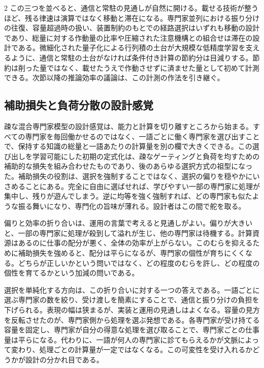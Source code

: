 \documentclass[lualatex,a4paper,10pt]{jlreq}
\begin{document}
\begin{multicols}{2}
この三つを並べると、通信と常駐の見通しが自然に開ける。載せる技術が整うほど、残る律速は演算ではなく移動と滞在になる。専門家並列における振り分けの往復、容量超過時の扱い、装置制約のもとでの経路選択はいずれも移動の設計であり\autocite{gshard}\autocite{deepseekmoe}、総量に対する作動量の比率や圧縮された注意機構との組合せは滞在の設計である\autocite{deepseekv2}。微細化された量子化による行列積の土台が大規模な低精度学習を支えるように\autocite{deepseekv3}\autocite{deepgemm}、通信と常駐の土台がなければ条件付き計算の節約分は目減りする。節約は削った量ではなく、載せたうえで作動させずに済ませた量として初めて計測できる。次節以降の推論効率の議論は、この計測の作法を引き継ぐ。

\subsection{補助損失と負荷分散の設計感覚}
疎な混合専門家模型の設計感覚は、能力と計算を切り離すところから始まる。すべての専門家を毎回働かせるのではなく、一語ごとに働く専門家を選び出すことで、保持する知識の総量と一語あたりの計算量を別の欄で大きくできる。この選び出しを学習可能にした初期の定式化は、疎なゲーティングと負荷を均すための補助的な損失を組み合わせたものであり、後のあらゆる選択方式の祖型になった\autocite{shazeer2017}。補助損失の役割は、選択を強制することではなく、選択の偏りを穏やかにいさめることにある。完全に自由に選ばせれば、学びやすい一部の専門家に処理が集中し、残りが遊んでしまう。逆に均等を強く強制すれば、どの専門家も似たような振る舞いになり、専門化の旨味が薄れる。設計者はこの間で舵を取る。

偏りと効率の折り合いは、運用の言葉で考えると見通しがよい。偏りが大きいと、一部の専門家に処理が殺到して溢れが生じ、他の専門家は待機する。計算資源はあるのに仕事の配分が悪く、全体の効率が上がらない。このむらを抑えるために補助損失を強めると、配分は平らになるが、専門家の個性が育ちにくくなる。どちらが正しいかという問いではなく、どの程度のむらを許し、どの程度の個性を育てるかという加減の問いである。

選択を単純化する方向は、この折り合いに対する一つの答えである。一語ごとに選ぶ専門家の数を絞り、受け渡しを簡素にすることで、通信と振り分けの負担を下げられる\autocite{switcht}。表現の幅は狭まるが、実装と運用の見通しはよくなる。容量の見方を反転させたのが、専門家側から処理を選ぶ発想である。各専門家が受け持てる容量を固定し、専門家が自分の得意な処理を選び取ることで、専門家ごとの仕事量は平らになる\autocite{expertchoice}。代わりに、一語が何人の専門家に診てもらえるかが文脈によって変わり、処理ごとの計算量が一定ではなくなる。この可変性を受け入れるかどうかが設計の分かれ目である。


\end{multicols}
\end{document}
